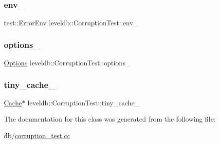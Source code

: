 \subsubsection{\texorpdfstring{env\_}{env\_}}
{\footnotesize\ttfamily test\+::\+Error\+Env leveldb\+::\+Corruption\+Test\+::env\+\_\+}

\mbox{\label{classleveldb_1_1_corruption_test_a6d639ef3ec7f1009447b85f9a10f90ac}} 
\subsubsection{\texorpdfstring{options\_}{options\_}}
{\footnotesize\ttfamily \mbox{\hyperlink{structleveldb_1_1_options}{Options}} leveldb\+::\+Corruption\+Test\+::options\+\_\+}

\mbox{\label{classleveldb_1_1_corruption_test_afc8ff2f272ee3da2756acc21c37750d5}} 
\subsubsection{\texorpdfstring{tiny\_cache\_}{tiny\_cache\_}}
{\footnotesize\ttfamily \mbox{\hyperlink{classleveldb_1_1_cache}{Cache}}$\ast$ leveldb\+::\+Corruption\+Test\+::tiny\+\_\+cache\+\_\+}



The documentation for this class was generated from the following file\+:\begin{DoxyCompactItemize}
\item 
db/\mbox{\hyperlink{corruption__test_8cc}{corruption\+\_\+test.\+cc}}\end{DoxyCompactItemize}
